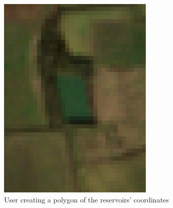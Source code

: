 \begin{figure}
\begin{subfigure}[b]{0.3\textwidth}
         \includegraphics[width=\linewidth]{contents/figures/LR 10m res.jpg}
         \caption{User creating a polygon of the reservoirs' coordinates}
         \label{fig:ipdgs ui polygon}
     \end{subfigure}
     \hfill
     \begin{subfigure}[b]{0.3\textwidth}
         \centering

\end{subfigure}
\end{figure}
